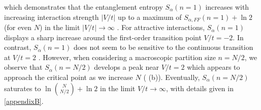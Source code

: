 % 
which demonstrates that the entanglement entropy $S_{\alpha}(n=1)$ increases
with increasing interaction strength $|V/t|$ up to a maximum of $
S_{\alpha,FF}(n=1)+\ln 2$ (for even $N$) in the limit $|V/t| \rightarrow
\infty$ \cite{Zozulya:2008kb,Haque:2009df}.  For attractive interactions,
$S_{\alpha}(n=1)$ displays a sharp increase around the first-order transition
point $V/t = -2$. In contrast, $S_{\alpha}(n=1)$ does not seem to be sensitive
to the continuous transition at $V/t=2$ \cite{Zozulya:2008kb}. However,
when considering a macroscopic partition size $n=N/2$, we observe that
$S_{\alpha}(n=N/2)$ develops a peak near $V/t=2$ which appears to
approach the critical point as we increase $N$ (
(b)). Eventually, $S_{\alpha}(n=N/2)$ saturates to $\ln \binom{N}{N/2}+\ln2$ in
the limit $V/t\rightarrow\infty$, with details given in \ref{appendixB}. 
 
